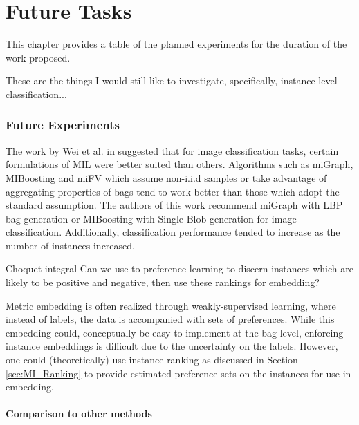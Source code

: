 \chapter{Future Tasks}
This chapter provides a table of the planned experiments for the duration of the work proposed.

These are the things I would still like to investigate, specifically, instance-level classification...

\subsection{Future Experiments}

The work by Wei et al. in \cite{Wei2016ImageBagGenerators} suggested that  for image classification tasks, certain formulations of MIL were better suited than others.  Algorithms such as miGraph, MIBoosting and miFV which assume non-i.i.d samples or take advantage of aggregating properties of bags tend to work better than those which adopt the standard assumption.  The authors of this work recommend miGraph with LBP bag generation or MIBoosting with Single Blob generation for image classification.  Additionally, classification performance tended to increase as the number of instances increased.

Choquet integral
Can we use to preference learning to discern instances which are likely to be positive and negative, then use these rankings for embedding?

Metric embedding is often realized through weakly-supervised learning, where instead of labels, the data is accompanied with sets of preferences. While this embedding could, conceptually be easy to implement at the bag level, enforcing instance embeddings is difficult due to the uncertainty on the labels.  However, one could (theoretically) use instance ranking as discussed in Section \ref{sec:MI_Ranking} to provide estimated preference sets on the instances for use in embedding.

\subsubsection{Comparison to other methods}

